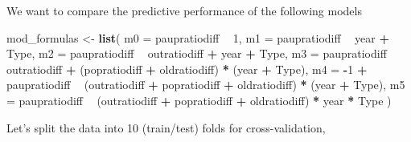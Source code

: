 \documentclass[]{article}
\newenvironment{Shaded}{\begin{snugshade}}{\end{snugshade}}
\newcommand{\KeywordTok}[1]{\textcolor[rgb]{0.13,0.29,0.53}{\textbf{#1}}}
\newcommand{\DataTypeTok}[1]{\textcolor[rgb]{0.13,0.29,0.53}{#1}}
\newcommand{\DecValTok}[1]{\textcolor[rgb]{0.00,0.00,0.81}{#1}}
\newcommand{\StringTok}[1]{\textcolor[rgb]{0.31,0.60,0.02}{#1}}
\newcommand{\OperatorTok}[1]{\textcolor[rgb]{0.81,0.36,0.00}{\textbf{#1}}}
\newcommand{\NormalTok}[1]{#1}
\begin{document}
We want to compare the predictive performance of the following models

\begin{Shaded}
\begin{Highlighting}[]
\NormalTok{mod_formulas <-}\StringTok{ }
\StringTok{  }\KeywordTok{list}\NormalTok{(}
    \DataTypeTok{m0 =}\NormalTok{ paupratiodiff }\OperatorTok{~}\StringTok{ }\DecValTok{1}\NormalTok{,}
    \DataTypeTok{m1 =}\NormalTok{ paupratiodiff }\OperatorTok{~}\StringTok{ }\NormalTok{year }\OperatorTok{+}\StringTok{ }\NormalTok{Type,    }
    \DataTypeTok{m2 =}\NormalTok{ paupratiodiff }\OperatorTok{~}\StringTok{ }\NormalTok{outratiodiff }\OperatorTok{+}\StringTok{ }\NormalTok{year }\OperatorTok{+}\StringTok{ }\NormalTok{Type,}
    \DataTypeTok{m3 =}\NormalTok{ paupratiodiff }\OperatorTok{~}\StringTok{ }\NormalTok{outratiodiff }\OperatorTok{+}\StringTok{ }\NormalTok{(popratiodiff }\OperatorTok{+}\StringTok{ }\NormalTok{oldratiodiff) }\OperatorTok{*}\StringTok{ }\NormalTok{(year }\OperatorTok{+}\StringTok{ }\NormalTok{Type),}
    \DataTypeTok{m4 =} \OperatorTok{-}\DecValTok{1}  \OperatorTok{+}\StringTok{ }\NormalTok{paupratiodiff }\OperatorTok{~}\StringTok{ }\NormalTok{(outratiodiff }\OperatorTok{+}\StringTok{ }\NormalTok{popratiodiff }\OperatorTok{+}\StringTok{ }\NormalTok{oldratiodiff) }\OperatorTok{*}\StringTok{ }\NormalTok{(year }\OperatorTok{+}\StringTok{ }\NormalTok{Type),}
    \DataTypeTok{m5 =}\NormalTok{ paupratiodiff }\OperatorTok{~}\StringTok{ }\NormalTok{(outratiodiff }\OperatorTok{+}\StringTok{ }\NormalTok{popratiodiff }\OperatorTok{+}\StringTok{ }\NormalTok{oldratiodiff) }\OperatorTok{*}\StringTok{ }\NormalTok{year }\OperatorTok{*}\StringTok{ }\NormalTok{Type}
\NormalTok{  )}
\end{Highlighting}
\end{Shaded}

Let's split the data into 10 (train/test) folds for cross-validation,

\begin{Shaded}
\end{Shaded}
\end{document}
